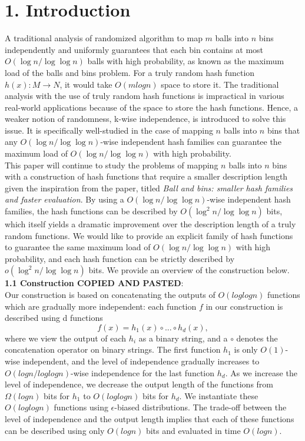 \documentclass[letterpaper]{article} %
\begin{document}
	\section{1. Introduction}
	A traditional analysis of randomized algorithm to map $m$ balls into $n$ bins independently and uniformly guarantees that each bin contains at most $O(\log n/\log\log n)$ balls with high probability, as known as the maximum load of the balls and bins problem. For a truly random hash function $h(x): M \rightarrow N$, it would take $O(mlogn)$ space to store it. The traditional analysis with the use of truly random hash functions is impractical in various real-world applications because of the space to store the hash functions. Hence, a weaker notion of randomness, k-wise independence, is introduced to solve this issue. It is specifically well-studied in the case of mapping $n$ balls into $n$ bins that any $O(\log n/\log\log n)$-wise independent hash families can guarantee the maximum load of $O(\log n/\log\log n)$ with high probability. \\
	\indent This paper will continue to study the problems of mapping $n$ balls into $n$ bins with a construction of hash functions that require a smaller description length given the inspiration from the paper, titled \textit{Ball and bins: smaller hash families and faster evaluation}. By using a $O(\log n/\log\log n)$-wise independent hash families, the hash functions can be described by $O(\log^2 n/\log\log n)$ bits, which itself yields a dramatic improvement over the description length of a truly random functions. We would like to provide an explicit family of hash functions to guarantee the same maximum load of $O(\log n/\log\log n)$ with high probability, and each hash function can be strictly described by $o(\log^2 n/\log\log n)$ bits. We provide an overview of the construction below.   \\
	
	\noindent\textbf{1.1 Construction COPIED AND PASTED}:  \\
	Our construction is based on concatenating the outputs of $O(log log n)$ functions which are gradually more independent: each function $f$ in our construction is described using d functions 
	$$f(x) = h_1(x) \circ ... \circ h_d(x),$$
	where we view the output of each $h_i$ as a binary string, and a $\circ$ denotes the concatenation operator on binary strings. The first function $h_1$ is only $O(1)$-wise independent, and the level of independence gradually increases to $O(log n/ log log n)$-wise independence for the last function $h_d$. As we increase the level of independence, we decrease the output length of the functions from $\Omega(log n)$ bits for $h_1$ to $O(log log n)$ bits for $h_d$. We instantiate these $O(log log n)$ functions using $\epsilon$-biased distributions. The trade-off between the level of independence and the output length implies that each of these functions can be described using only $O(log n)$ bits and evaluated in time $O(log n)$. \\
	
\end{document}
